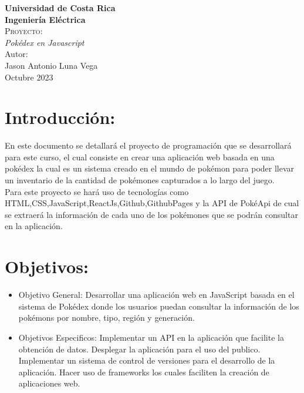 \documentclass[12pt]{article}
\begin{document}
	\begin{titlepage}
		\centering
		\textbf{\LARGE Universidad de Costa Rica}\\
		\vspace{3cm}
		\textbf{\Large Ingeniería Eléctrica}\\
		\vspace{1.5cm}
		\textsc{ \Huge Proyecto:}\\
		\vspace{3cm}
		\textit{\Large Pokédex en Javascript }\\
		\vfill       
		\Large Autor: \\
		\Large Jason Antonio Luna Vega\\
		\vfill
		\Large Octubre 2023\\
	\end{titlepage}
	
	\tableofcontents\vspace{18cm}

    \section{Introducción: }
    En este documento se detallará el proyecto de programación que se desarrollará para este curso, el cual consiste en crear una aplicación web basada en una pokédex la cual es un sistema creado en el mundo de pokémon para poder llevar un inventario de la cantidad de pokémones capturados a lo largo del juego.\vspace{0.5cm}
    \\
    Para este proyecto se hará uso de tecnologías como HTML,CSS,JavaScript,ReactJs,Github,GithubPages y la API de PokéApi de cual se extraerá la información de cada uno de los pokémones que se podrán consultar en la aplicación.\vspace{0.5cm}
    \\

    \section{Objetivos: }
        \begin{itemize}
            \item Objetivo General: Desarrollar una aplicación web en JavaScript basada en el sistema de Pokédex donde los usuarios puedan consultar la información de los pokémons por nombre, tipo, región y generación.
            \item Objetivos Especificos:
                \subitem Implementar un API en la aplicación que facilite la obtención de datos.
                \subitem Desplegar la aplicación para el uso del publico.
                \subitem Implementar un sistema de control de versiones para el desarrollo de la aplicación.
                \subitem Hacer uso de frameworks los cuales faciliten la creación de aplicaciones web.
        \end{itemize}
\end{document}
